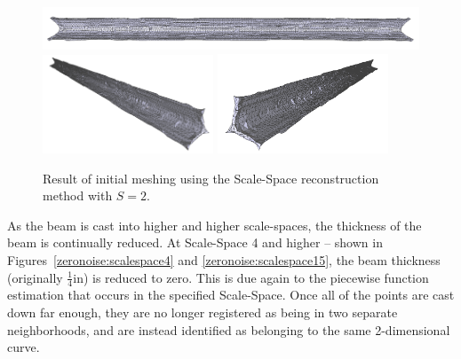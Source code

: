 \documentclass[12pt]{drexelthesis}
\begin{document}
\begin{figure}[!ht]
	\centering
		\includegraphics[width=5in]{simulated-lab-scan/0noise/cleanNeat/scalespace200.png}
		\includegraphics[width=2in]{simulated-lab-scan/0noise/cleanNeat/scalespace201.png}
		\includegraphics[width=2in]{simulated-lab-scan/0noise/cleanNeat/scalespace202.png}
		\caption[Initial meshing using a Scale-Space reconstruction with $S = 2$]{\centering  Result of initial meshing using the Scale-Space reconstruction method with $S = 2$.}
	\label{zeronoise:scalespace2}
\end{figure}

As the beam is cast into higher and higher scale-spaces, the thickness of the beam is continually reduced. At Scale-Space 4 and higher -- shown in Figures~\ref{zeronoise:scalespace4} and \ref{zeronoise:scalespace15}, the beam thickness (originally $\frac{1}{4}$in) is reduced to zero. This is due again to the piecewise function estimation that occurs in the specified Scale-Space. Once all of the points are cast down far enough, they are no longer registered as being in two separate neighborhoods, and are instead identified as belonging to the same 2-dimensional curve.
\end{document}
